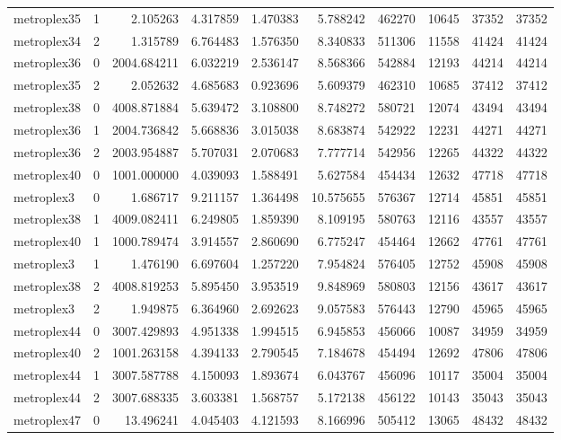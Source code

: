 \begin{longtable}{|l|r|r|r|r|r|r|r|r|r|}
metroplex35 & 1 & 2.105263 & 4.317859 & 1.470383 & 5.788242 & 462270 & 10645 & 37352 & 37352 \\
metroplex34 & 2 & 1.315789 & 6.764483 & 1.576350 & 8.340833 & 511306 & 11558 & 41424 & 41424 \\
metroplex36 & 0 & 2004.684211 & 6.032219 & 2.536147 & 8.568366 & 542884 & 12193 & 44214 & 44214 \\
metroplex35 & 2 & 2.052632 & 4.685683 & 0.923696 & 5.609379 & 462310 & 10685 & 37412 & 37412 \\
metroplex38 & 0 & 4008.871884 & 5.639472 & 3.108800 & 8.748272 & 580721 & 12074 & 43494 & 43494 \\
metroplex36 & 1 & 2004.736842 & 5.668836 & 3.015038 & 8.683874 & 542922 & 12231 & 44271 & 44271 \\
metroplex36 & 2 & 2003.954887 & 5.707031 & 2.070683 & 7.777714 & 542956 & 12265 & 44322 & 44322 \\
metroplex40 & 0 & 1001.000000 & 4.039093 & 1.588491 & 5.627584 & 454434 & 12632 & 47718 & 47718 \\
metroplex3 & 0 & 1.686717 & 9.211157 & 1.364498 & 10.575655 & 576367 & 12714 & 45851 & 45851 \\
metroplex38 & 1 & 4009.082411 & 6.249805 & 1.859390 & 8.109195 & 580763 & 12116 & 43557 & 43557 \\
metroplex40 & 1 & 1000.789474 & 3.914557 & 2.860690 & 6.775247 & 454464 & 12662 & 47761 & 47761 \\
metroplex3 & 1 & 1.476190 & 6.697604 & 1.257220 & 7.954824 & 576405 & 12752 & 45908 & 45908 \\
metroplex38 & 2 & 4008.819253 & 5.895450 & 3.953519 & 9.848969 & 580803 & 12156 & 43617 & 43617 \\
metroplex3 & 2 & 1.949875 & 6.364960 & 2.692623 & 9.057583 & 576443 & 12790 & 45965 & 45965 \\
metroplex44 & 0 & 3007.429893 & 4.951338 & 1.994515 & 6.945853 & 456066 & 10087 & 34959 & 34959 \\
metroplex40 & 2 & 1001.263158 & 4.394133 & 2.790545 & 7.184678 & 454494 & 12692 & 47806 & 47806 \\
metroplex44 & 1 & 3007.587788 & 4.150093 & 1.893674 & 6.043767 & 456096 & 10117 & 35004 & 35004 \\
metroplex44 & 2 & 3007.688335 & 3.603381 & 1.568757 & 5.172138 & 456122 & 10143 & 35043 & 35043 \\
metroplex47 & 0 & 13.496241 & 4.045403 & 4.121593 & 8.166996 & 505412 & 13065 & 48432 & 48432 \\

\end{longtable}
